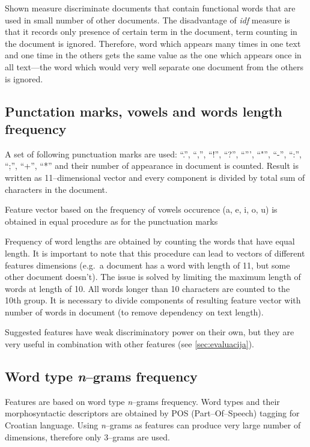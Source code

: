 \documentclass[11pt,english]{article}
\begin{document}
\begin{multicols}{2}
Shown measure discriminate documents that contain functional words that are used
in small number of other documents. The disadvantage of \emph{idf} measure is
that it records only presence of certain term in the document, term
counting in the document is ignored. Therefore, word which appears many times in
one text and one time in the others gets the same value as the one which appears
once in all text---the word which would very well separate one document from the
others is ignored.

\subsection{Punctation marks, vowels and words length frequency}
\label{sec:znacajke-manje}
A set of following punctuation marks are used: ``.'', ``,'', ``!'', ``?'',
``''', ``"'', ``-'', ``:'', ``;'', ``+'', ``*'' and their number of appearance in
document is counted. Result is written as 11--dimensional vector and every
component is divided by total sum of characters in the document.

Feature vector based on the frequency of vowels occurence (a, e, i, o, u) is
obtained in equal procedure as for the punctuation marks

Frequency of word lengths are obtained by counting the words that have equal
length. It is important to note that this procedure can lead to vectors of
different features dimensions (e.g.\ a document has a word with length of 11,
but some other document doesn't). The issue is solved by limiting the maximum
length of words at length of 10. All words longer than 10 characters are
counted to the 10th group. It is necessary to divide components of resulting feature
vector with number of words in document (to remove dependency on text length).

Suggested features have weak discriminatory power on their own, but they are
very useful in combination with other features (see \ref{sec:evaluacija}).

\subsection{Word type \emph{n}--grams frequency}
\label{sec:ngrami-tipova}
Features are based on word type \emph{n}--grams frequency. Word types and their
morphosyntactic descriptors are obtained by POS (Part--Of--Speech) tagging for
Croatian language. Using \emph{n}--grams as features can produce very large
number of dimensions, therefore only 3--grams are used.


\end{multicols}
\end{document}
